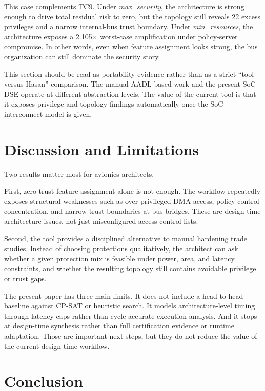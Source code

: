 \documentclass[conference]{IEEEtran}
\begin{document}
This case complements TC9. Under \textit{max\_security}, the architecture is
strong enough to drive total residual risk to zero, but the topology still
reveals 22 excess privileges and a narrow internal-bus trust boundary. Under
\textit{min\_resources}, the architecture exposes a 2.105$\times$ worst-case
amplification under policy-server compromise. In other words, even when
feature assignment looks strong, the bus organization can still dominate the
security story.

This section should be read as portability evidence rather than as a strict
``tool versus Hasan'' comparison. The manual AADL-based work and the present
SoC DSE operate at different abstraction levels. The value of the current
tool is that it exposes privilege and topology findings automatically once
the SoC interconnect model is given.

\section{Discussion and Limitations}

Two results matter most for avionics architects.

First, zero-trust feature assignment alone is not enough. The workflow
repeatedly exposes structural weaknesses such as over-privileged DMA access,
policy-control concentration, and narrow trust boundaries at bus bridges.
These are design-time architecture issues, not just misconfigured
access-control lists.

Second, the tool provides a disciplined alternative to manual hardening trade
studies. Instead of choosing protections qualitatively, the architect can ask
whether a given protection mix is feasible under power, area, and latency
constraints, and whether the resulting topology still contains avoidable
privilege or trust gaps.

The present paper has three main limits. It does not include a head-to-head
baseline against CP-SAT or heuristic search. It models architecture-level
timing through latency caps rather than cycle-accurate execution analysis.
And it stops at design-time synthesis rather than full certification evidence
or runtime adaptation. Those are important next steps, but they do not reduce
the value of the current design-time workflow.

\section{Conclusion}
\end{document}
